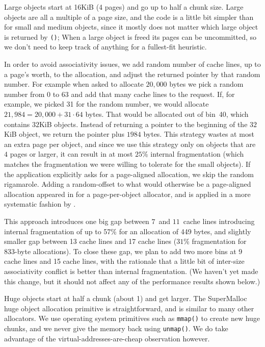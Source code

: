 \documentclass[pldi]{sigplanconf-pldi15}
\newcommand{\code}[1]{\texttt{#1}}
\begin{document}

Large objects start at 16KiB (4 pages) and go up to half a chunk size.
Large objects are all a multiple of a page size, and the code is a
little bit simpler than for small and medium objects, since it mostly
does not matter which large object is returned by \code{\malloc()};
When a large object is freed its pages can be uncommitted, so we don't
need to keep track of anything for a fullest-fit heuristic.

In order to avoid associativity issues, we add random number of cache
lines, up to a page's worth, to the allocation, and adjust the
returned pointer by that random number.  For example when asked to
allocate $20,000$ bytes we pick a random number from 0 to 63 and add
that many cache lines to the request.  If, for example, we picked 31
for the random number, we would allocate $21,984 = 20,000+31\cdot64$
bytes.  That would be allocated out of bin~40, which contains $32$KiB
objects.  Instead of returning a pointer to the beginning of the
$32$KiB object, we return the pointer plus $1984$ bytes.  This
strategy wastes at most an extra page per object, and since we use
this strategy only on objects that are $4$ pages or larger, it can
result in at most $25$\% internal fragmentation (which matches the
fragmentation we were willing to tolerate for the small objects).  If
the application explicitly asks for a page-aligned allocation, we skip
the random rigamarole.  Adding a random-offset to what would otherwise
be a page-aligned allocation appeared in \cite{LvinNoBe08} for a
page-per-object allocator, and is applied in a more systematic fashion
by \cite{AfekDiMo11}.

This approach introduces one big gap between $7$~and $11$~cache lines
introducing internal fragmentation of up to 57\% for an allocation of
449 bytes, and slightly smaller gap between 13 cache lines and 17
cache lines ($31$\% fragmentation for 833-byte allocations).  To close
these gap, we plan to add two more bins at 9 cache lines and 15 cache
lines, with the rationale that a little bit of inter-size
associativity conflict is better than internal fragmentation.  (We
haven't yet made this change, but it should not affect any of the
performance results shown below.)


Huge objects start at half a chunk (about \unit{1}\mebi\byte{}) and
get larger.  The SuperMalloc huge object allocation primitive is
straightforward, and is similar to many other allocators.  We use
operating system primitives such as \code{mmap()} to create new huge
chunks, and we never give the memory back using \code{unmap()}.  We do
take advantage of the virtual-addresses-are-cheap observation however.
\end{document}
